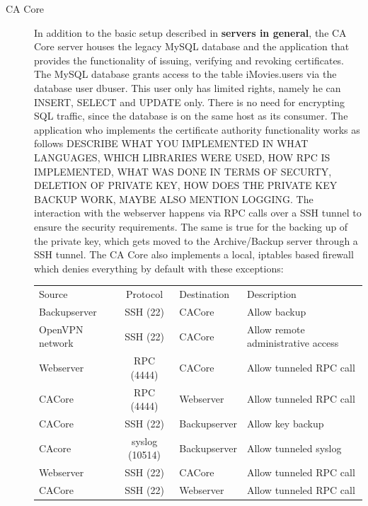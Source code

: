 \documentclass[a4paper, toc=index, 12pt, DIV14, twoside, BCOR2cm, headsepline, numbers=noenddot, bibliography=totoc]{scrbook}
\begin{document}
\begin{description}
\item[CA Core ] In addition to the basic setup described in {\bfseries servers in general}, the CA Core server houses the legacy MySQL database and the application that provides the functionality of issuing, verifying and revoking certificates. \newline
The MySQL database grants access to the table iMovies.users via the database user dbuser. This user only has limited rights, namely he can INSERT, SELECT and UPDATE only. There is no need for encrypting SQL traffic, since the database is on the same host as its consumer.\newline
The application who implements the certificate authority functionality works as follows DESCRIBE WHAT YOU IMPLEMENTED IN WHAT LANGUAGES, WHICH LIBRARIES WERE USED, HOW RPC IS IMPLEMENTED, WHAT WAS DONE IN TERMS OF SECURTY, DELETION OF PRIVATE KEY, HOW DOES THE PRIVATE KEY BACKUP WORK, MAYBE ALSO MENTION LOGGING.\newline
The interaction with the webserver happens via RPC calls over a SSH tunnel to ensure the security requirements. The same is true for the backing up of the private key, which gets moved to the Archive/Backup server through a SSH tunnel.\newline
The CA Core also implements a local, iptables based firewall which denies everything by default with these exceptions:\newline
\begin{tabular}{p{2.5cm} c l p{4.5cm}}
Source & Protocol & Destination & Description\\
\cline{1-4}
Backupserver & SSH (22) & CACore & Allow backup \\
\cline{1-4}
OpenVPN network & SSH (22) & CACore & Allow remote administrative access  \\
\cline{1-4}
Webserver & RPC (4444) & CACore & Allow tunneled RPC call \\
\cline{1-4}
CACore & RPC (4444) & Webserver & Allow tunneled RPC call \\
\cline{1-4}
CACore & SSH (22) & Backupserver & Allow key backup \\
\cline{1-4}
CAcore & syslog (10514) & Backupserver & Allow tunneled syslog\\
\cline{1-4}
Webserver & SSH (22) & CACore & Allow tunneled RPC call \\
\cline{1-4}
CACore & SSH (22) & Webserver & Allow tunneled RPC call \\
\end{tabular}



\end{description}
\end{document}
